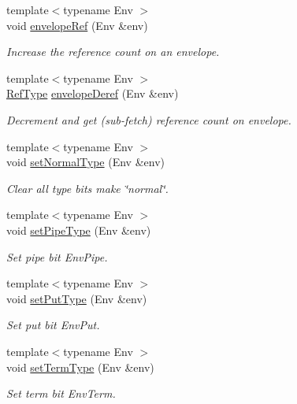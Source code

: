 \begin{DoxyCompactItemize}
{\footnotesize template$<$typename Env $>$ }\\void \hyperlink{namespacevt_a68c41bd1b8addd0f8feea15a61d5c372}{envelope\+Ref} (Env \&env)
\begin{DoxyCompactList}\small\item\em Increase the reference count on an envelope. \end{DoxyCompactList}\item 
{\footnotesize template$<$typename Env $>$ }\\\hyperlink{namespacevt_a9b39ce9494bb04674d0d5b895a5aa50f}{Ref\+Type} \hyperlink{namespacevt_a6083c0bb47b5d180acb1f32542833e67}{envelope\+Deref} (Env \&env)
\begin{DoxyCompactList}\small\item\em Decrement and get (sub-\/fetch) reference count on envelope. \end{DoxyCompactList}\item 
{\footnotesize template$<$typename Env $>$ }\\void \hyperlink{namespacevt_aa76e59d48d53aa1e4c60bd55ff520d6a}{set\+Normal\+Type} (Env \&env)
\begin{DoxyCompactList}\small\item\em Clear all type bits make \char`\"{}normal\char`\"{}. \end{DoxyCompactList}\item 
{\footnotesize template$<$typename Env $>$ }\\void \hyperlink{namespacevt_a4ecba7a91cd1d5a6b6473cbac2042c2b}{set\+Pipe\+Type} (Env \&env)
\begin{DoxyCompactList}\small\item\em Set pipe bit {\ttfamily Env\+Pipe}. \end{DoxyCompactList}\item 
{\footnotesize template$<$typename Env $>$ }\\void \hyperlink{namespacevt_ab25ac0a12270d261c2f5c3c634f6370e}{set\+Put\+Type} (Env \&env)
\begin{DoxyCompactList}\small\item\em Set put bit {\ttfamily Env\+Put}. \end{DoxyCompactList}\item 
{\footnotesize template$<$typename Env $>$ }\\void \hyperlink{namespacevt_aa42d7e0adc8b283dd10602ece422699d}{set\+Term\+Type} (Env \&env)
\begin{DoxyCompactList}\small\item\em Set term bit {\ttfamily Env\+Term}. \end{DoxyCompactList}\item 

\end{DoxyCompactItemize}
